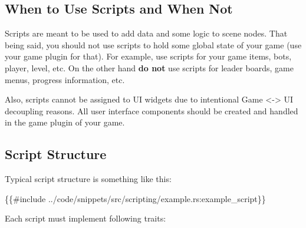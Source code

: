\documentclass[
]{book}
\newenvironment{Shaded}{\begin{snugshade}}{\end{snugshade}}
\newcommand{\NormalTok}[1]{#1}
\theoremstyle{definition}
\theoremstyle{definition}
\theoremstyle{definition}
\theoremstyle{definition}
\theoremstyle{remark}
\begin{document}
\subsection{When to Use Scripts and When Not}\label{when-to-use-scripts-and-when-not}

Scripts are meant to be used to add data and some logic to scene nodes. That being said, you should not use scripts to hold some global state of your game (use your game plugin for that). For example, use scripts for your game items, bots, player, level, etc. On the other hand \textbf{do not} use scripts for leader boards, game menus, progress information, etc.

Also, scripts cannot be assigned to UI widgets due to intentional Game \textless-\textgreater{} UI decoupling reasons. All user interface components should be created and handled in the game plugin of your game.

\subsection{Script Structure}\label{script-structure}

Typical script structure is something like this:

\begin{Shaded}
\begin{Highlighting}[]
\NormalTok{\{\{\#include ../code/snippets/src/scripting/example.rs:example\_script\}\}}
\end{Highlighting}
\end{Shaded}

Each script must implement following traits:
\end{document}
